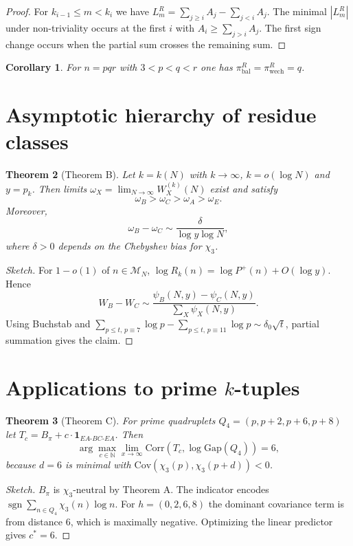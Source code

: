 \documentclass{article}
\newtheorem{theorem}{Theorem}[section]
\newtheorem{corollary}[theorem]{Corollary}
\theoremstyle{definition}
\newcommand{\N}{\mathbb{N}}
\newcommand{\Cov}{\mathrm{Cov}}
\newcommand{\Corr}{\mathrm{Corr}}
\newcommand{\one}{\mathbf{1}}
\begin{document}
	\begin{proof}
		For $k_{i-1}\le m<k_i$ we have $L_m^R=\sum_{j\ge i}A_j-\sum_{j<i}A_j$. The minimal $|L_m^R|$ under non-triviality occurs at the first $i$ with $A_i\ge \sum_{j>i}A_j$. The first sign change occurs when the partial sum crosses the remaining sum.
	\end{proof}
	
	\begin{corollary}
		For $n=pqr$ with $3<p<q<r$ one has $\pi_{\mathrm{bal}}^R=\pi_{\mathrm{wech}}^R=q$.
	\end{corollary}
	
	\section{Asymptotic hierarchy of residue classes}
	
	\begin{theorem}[Theorem B]
		Let $k=k(N)$ with $k\to\infty$, $k=o(\log N)$ and $y=p_k$. Then limits $\omega_X=\lim_{N\to\infty}W_X^{(k)}(N)$ exist and satisfy
		\[
		\omega_B>\omega_C>\omega_A>\omega_E.
		\]
		Moreover,
		\[
		\omega_B-\omega_C \sim \frac{\delta}{\log y\log N},
		\]
		where $\delta>0$ depends on the Chebyshev bias for $\chi_3$.
	\end{theorem}
	
	\begin{proof}[Sketch]
		For $1-o(1)$ of $n\in\mathcal M_N$, $\log R_k(n)=\log P^+(n)+O(\log y)$. Hence
		\[
		W_B-W_C \sim \frac{\psi_B(N,y)-\psi_C(N,y)}{\sum_X \psi_X(N,y)}.
		\]
		Using Buchstab and $\sum_{p\le t,\,p\equiv 7}\log p-\sum_{p\le t,\,p\equiv 11}\log p \sim \delta_0\sqrt{t}$, partial summation gives the claim.
	\end{proof}
	
	\section{Applications to prime $k$-tuples}
	
	\begin{theorem}[Theorem C]
		For prime quadruplets $Q_4=(p,p+2,p+6,p+8)$ let $T_c=B_\pi + c\cdot \one_{EA\text{-}BC\text{-}EA}$. Then
		\[
		\arg\max_{c\in\N} \lim_{x\to\infty}\Corr(T_c,\log\mathrm{Gap}(Q_4)) = 6,
		\]
		because $d=6$ is minimal with $\Cov(\chi_3(p),\chi_3(p+d))<0$.
	\end{theorem}
	
	\begin{proof}[Sketch]
		$B_\pi$ is $\chi_3$-neutral by Theorem A. The indicator encodes $\operatorname{sgn}\sum_{n\in Q_4}\chi_3(n)\log n$. For $h=(0,2,6,8)$ the dominant covariance term is from distance $6$, which is maximally negative. Optimizing the linear predictor gives $c^*=6$.
	\end{proof}
	
\end{document}
